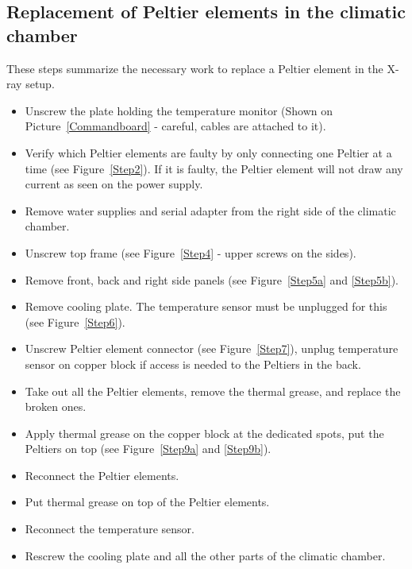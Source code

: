 \documentclass[a4paper,12pt,twoside]{article}
\begin{document}
\begin{appendices}

\section{Replacement of Peltier elements in the climatic chamber} \label{Peltier}

These steps summarize the necessary work to replace a Peltier element in the X-ray setup.
\begin{itemize}
\item Unscrew the plate holding the temperature monitor (Shown on Picture~\ref{Commandboard} - careful, cables are attached to it).
\item Verify which Peltier elements are faulty by only connecting one Peltier at a time (see Figure~\ref{Step2}). If it is faulty, the Peltier element will not draw any current as seen on the power supply.
\item Remove water supplies and serial adapter from the right side of the climatic chamber.
\item Unscrew top frame (see Figure~\ref{Step4} - upper screws on the sides).
\item Remove front, back and right side panels (see Figure~\ref{Step5a} and \ref{Step5b}).
\item Remove cooling plate. The temperature sensor must be unplugged for this (see Figure~\ref{Step6}).
\item Unscrew Peltier element connector (see Figure~\ref{Step7}), unplug temperature sensor on copper block if access is needed to the Peltiers in the back.
\item Take out all the Peltier elements, remove the thermal grease, and replace the broken ones.
\item Apply thermal grease on the copper block at the dedicated spots, put the Peltiers on top (see Figure~\ref{Step9a} and \ref{Step9b}).
\item Reconnect the Peltier elements.
\item Put thermal grease on top of the Peltier elements.
\item Reconnect the temperature sensor.
\item Rescrew the cooling plate and all the other parts of the climatic chamber.


\end{itemize}
\end{appendices}
\end{document}
